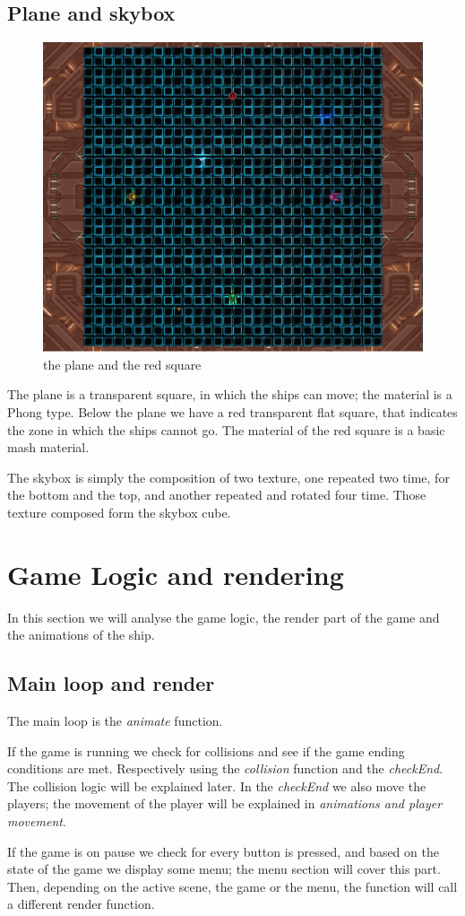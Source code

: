 \documentclass[11pt]{article}
\begin{document}
\subsection{Plane and skybox}

\begin{figure}
	\centering
	\includegraphics[width=0.4\linewidth]{plane}
	\caption{the plane and the red square}
\end{figure}
The plane is a transparent square, in which the ships can move; the material is a Phong type. Below the plane we have a red transparent flat square, that indicates the zone in which the ships cannot go. The material of the red square is a basic mash material.

The skybox is simply the composition of two texture, one repeated two time, for the bottom and the top, and another repeated and rotated four time. Those texture composed form the skybox cube.

\newpage
\section{Game Logic and rendering}
In this section we will analyse the game logic, the render part of the game and the animations of the ship. 
\subsection{Main loop and render}

The main loop is the \textit{animate} function. 

If the game is running we check for collisions and see if the game ending conditions are met. Respectively using the \textit{collision} function and the \textit{checkEnd}. The collision logic will be explained later. In the \textit{checkEnd} we also move the players; the movement of the player will be explained in \textit{animations and player movement}.

If the game is on pause we check for every button is pressed, and based on the state of the game we display some menu; the menu section will cover this part. Then, depending on the active scene, the game or the menu, the function will call a different render function. 
\end{document}
